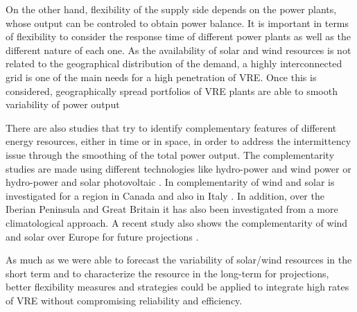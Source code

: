On the other hand, flexibility of the supply side depends on the power plants, whose output can be controled to obtain power balance. It is important in terms of flexibility to consider the response time of different power plants as well as the different nature of each one. As the availability of solar and wind resources is not related to the geographical distribution of the demand, a highly interconnected grid is one of the main needs for a high penetration of VRE. Once this is considered, geographically spread portfolios of VRE plants are able to smooth variability of power output \cite*{KROPOSKI2017, Marcos2012, Hoff2010, Hoff2012}


There are also studies that try to identify complementary features of different energy resources, either in time or in space, in order to address the intermittency issue through the smoothing of the total power output. The complementarity studies are made using different technologies like hydro-power and wind power \cite*{Denault2009, Silva2016} or hydro-power and solar photovoltaic \cite*{Francois2016, Beluco2012, Kougias2016}. In \cite*{Hoicka2011} complementarity of wind and solar is investigated for a region in Canada and also in Italy \cite*{Monforti2014}.  In addition, over the Iberian Peninsula \cite*{Santos-Alamillos2012, Jerez2013b} and Great Britain \cite*{Bett2016} it has also been investigated from a more climatological approach. A recent study also shows the complementarity of wind and solar over Europe for future projections \cite*{Jerez2019}.

As much as we were able to forecast the variability of solar/wind resources in the short term and to characterize the resource in the long-term for projections, better flexibility measures and strategies could be applied to integrate high rates of VRE without compromising reliability and efficiency.

